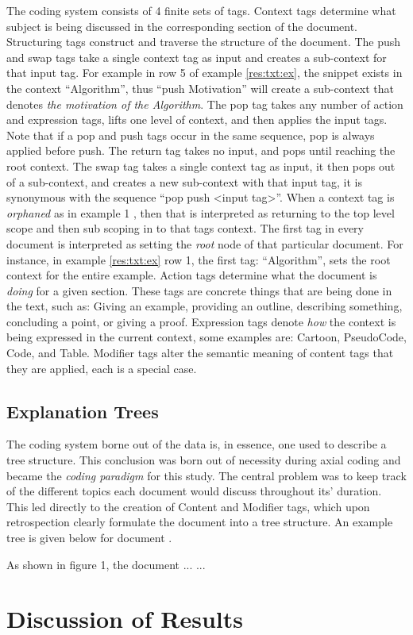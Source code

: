 \documentclass[sigconf]{acmart}
\begin{document}
The coding system consists of 4 finite sets of tags. Context tags determine what
subject is being discussed in the corresponding section of the document.
%
Structuring tags construct and traverse the structure of the document. The
push and swap tags take a single context tag as input and creates a sub-context
for that input tag. For example in row 5 of example \ref{res:txt:ex}, the
snippet exists in the context ``Algorithm'', thus ``push Motivation'' will
create a sub-context that denotes \emph{the motivation of the Algorithm}.
%
The pop tag takes any number of action and expression tags, lifts one level of
context, and then applies the input tags. Note that if a pop and push tags occur
in the same sequence, pop is always applied before push. The return tag takes no
input, and pops until reaching the root context. The swap tag takes a single
context tag as input, it then pops out of a sub-context, and creates a new
sub-context with that input tag, it is synonymous with the sequence ``pop push
<input tag>''.
%
When a context tag is \emph{orphaned} as in example 1 , then that is interpreted as returning to the top level scope and then
sub scoping in to that tags context. The first tag in every document is
interpreted as setting the \emph{root} node of that particular document. For
instance, in example \ref{res:txt:ex} row 1, the first tag: ``Algorithm'', sets
the root context for the entire example.
%
Action tags determine what the document is \emph{doing} for a given section.
These tags are concrete things that are being done in the text, such as: Giving
an example, providing an outline, describing something, concluding a point, or
giving a proof.
%
Expression tags denote \emph{how} the context is being expressed in the current
context, some examples are: Cartoon, PseudoCode, Code, and Table. Modifier
tags alter the semantic meaning of content tags that they are applied, each is a
special case.
%

\subsection{Explanation Trees}
\label{sec:res:xopTree}
The coding system borne out of the data is, in essence, one used to describe a
tree structure. This conclusion was born out of necessity during axial coding
and became the \emph{coding paradigm} for this study. The central problem was to
keep track of the different topics each document would discuss throughout its'
duration. This led directly to the creation of Content and Modifier tags, which
upon retrospection clearly formulate the document into a tree structure. An
example tree is given below for document .



As shown in figure 1, the document ... ... 


\section{Discussion of Results}





\end{document}
